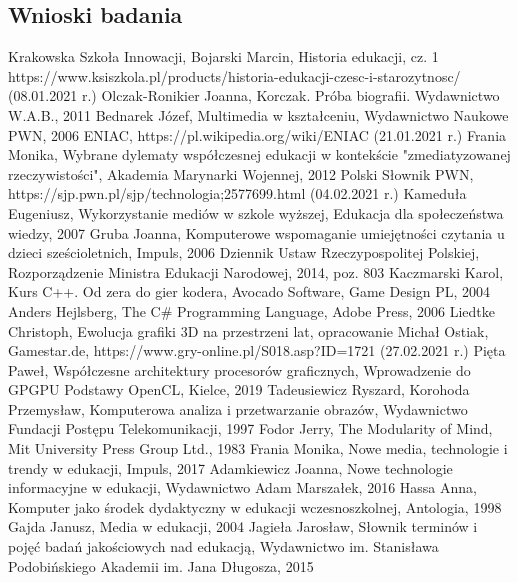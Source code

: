 \documentclass{article}
\begin{document}
	\subsection{Wnioski badania}
	
	\newpage
	\renewcommand\refname{\section*{Bibliografia}}
	\begin{thebibliography}{30}\linespread{1}\normalsize{
			Krakowska Szkoła Innowacji, Bojarski Marcin, Historia edukacji, cz. 1  https://www.ksiszkola.pl/products/historia-edukacji-czesc-i-starozytnosc/ (08.01.2021 r.)
			Olczak-Ronikier Joanna, Korczak. Próba biografii. Wydawnictwo W.A.B., 2011
			Bednarek Józef, Multimedia w kształceniu, Wydawnictwo Naukowe PWN, 2006
			ENIAC, https://pl.wikipedia.org/wiki/ENIAC (21.01.2021 r.)
			Frania Monika, Wybrane dylematy współczesnej edukacji w kontekście "zmediatyzowanej rzeczywistości", Akademia Marynarki Wojennej, 2012
			Polski Słownik PWN, https://sjp.pwn.pl/sjp/technologia;2577699.html (04.02.2021 r.)
			Kameduła Eugeniusz, Wykorzystanie mediów w szkole wyższej, Edukacja dla społeczeństwa wiedzy, 2007
			Gruba Joanna, Komputerowe wspomaganie umiejętności czytania u dzieci sześcioletnich, Impuls, 2006
			Dziennik Ustaw Rzeczypospolitej Polskiej, Rozporządzenie Ministra Edukacji Narodowej, 2014, poz. 803
			Kaczmarski Karol, Kurs C++. Od zera do gier kodera, Avocado Software, Game Design PL, 2004
			Anders Hejlsberg, The C# Programming Language, Adobe Press, 2006
			Liedtke Christoph, Ewolucja grafiki 3D na przestrzeni lat, opracowanie Michał Ostiak, Gamestar.de, https://www.gry-online.pl/S018.asp?ID=1721 (27.02.2021 r.)
			Pięta Paweł, Współczesne architektury procesorów graficznych, Wprowadzenie do GPGPU Podstawy OpenCL, Kielce, 2019
			Tadeusiewicz Ryszard, Korohoda Przemysław, Komputerowa analiza i przetwarzanie obrazów, Wydawnictwo Fundacji Postępu Telekomunikacji, 1997
			Fodor Jerry, The Modularity of Mind, Mit University Press Group Ltd., 1983
			Frania Monika, Nowe media, technologie i trendy w edukacji, Impuls, 2017
			Adamkiewicz Joanna, Nowe technologie informacyjne w edukacji, Wydawnictwo Adam Marszałek, 2016
			Hassa Anna, Komputer jako środek dydaktyczny w edukacji wczesnoszkolnej, Antologia, 1998
			Gajda Janusz, Media w edukacji, 2004
			Jagieła Jarosław, Słownik terminów i pojęć badań jakościowych nad edukacją, Wydawnictwo im. Stanisława Podobińskiego Akademii im. Jana Długosza, 2015
		}
	\end{thebibliography}
	\newpage
	\renewcommand{\listfigurename}{Spis obrazów}
	\listoffigures
	\newpage
	
	\newpage
	\renewcommand\lstlistlistingname{Fragmenty kodu}
	\begin{lstlistoflistings}
	\end{lstlistoflistings}
	\newpage
	
	
\end{document}
